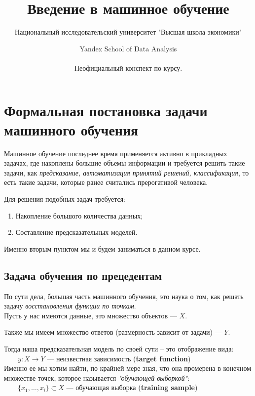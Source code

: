\documentclass{article}
\title{Введение в машинное обучение}
\author{Национальный исследовательский университет "Высшая школа экономики" \and Yandex School of Data Analysis\\\\
Неофициальный конспект по курсу.}
\begin{document}
\maketitle
\tableofcontents
\newpage

\section{Формальная постановка задачи машинного обучения}

Машинное обучение последнее время применяется активно в прикладных задачах, где накоплены большие объемы информации и требуется решить такие задачи, как \textit{предсказание, автоматизация принятий решений, классификация}, то есть такие задачи, которые ранее считались прерогативой человека.

Для решения подобных задач требуется:

\begin{enumerate}
\item Накопление большого количества данных;
\item Составление предсказательных моделей.
\end{enumerate}

Именно вторым пунктом мы и будем заниматься в данном курсе.

\subsection{Задача обучения по прецедентам}

По сути дела, большая часть машинного обучения, это наука о том, как решать задачу \textit{восстановления функции по точкам}.
\\

Пусть у нас имеются данные, это множество объектов --- $X$.

Также мы имеем множество ответов (размерность зависит от задачи) --- $Y$.

Тогда наша предсказательная модель по своей сути -- это отображение вида:
\\

$\qquad y : X \rightarrow Y$ --- неизвестная зависимость (\textbf{target function})
\\

Именно ее мы хотим найти, по крайней мере зная, что она промерена в конечном множестве точек, которое называется \textit{"обучающей выборкой"}:
\\

$\qquad \{x_1, \ldots, x_l\} \subset X$ --- обучающая выборка (\textbf{training sample})
\end{document}
